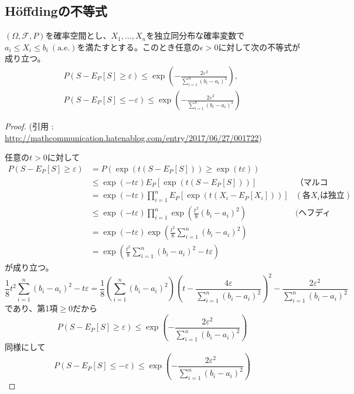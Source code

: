         \subsection{H\"{o}ffdingの不等式}
            \begin{shadebox}
                $(\Omega,\mathcal{F},P)$を確率空間とし、$X_{1},\ldots,X_{n}$を独立同分布な確率変数で$a_{i}\le X_{i} \le b_{i}\ (\mathrm{a.e.})$を満たすとする。このとき任意の$\epsilon>0$に対して次の不等式が成り立つ。
                \begin{gather*}
                    P(S-E_{P}[S]\ge\varepsilon)\le \exp\left(-\frac{2\varepsilon^{2}}{\sum_{i=1}^{n}(b_{i}-a_{i})^{2}}\right),\\
                    P(S-E_{P}[S]\le-\varepsilon)\le\exp\left(-\frac{2\varepsilon^{2}}{\sum_{i=1}^{n}(b_{i}-a_{i})^{2}}\right)
                \end{gather*}
            \end{shadebox}
            \begin{proof}
                \quad\par
                (引用 : \url{http://mathcommunication.hatenablog.com/entry/2017/06/27/001722})
                \par
                任意の$t>0$に対して
                \begin{align*}
                    P(S-E_{P}[S]\ge\varepsilon) &= P(\exp(t(S-E_{P}[S]))\ge\exp(t\varepsilon))\\
                    &\le \exp(-t\varepsilon)E_{P}[\exp(t(S-E_{P}[S]))] & \text{（マルコフの不等式）}\\
                    &= \exp(-t\varepsilon)\prod_{i=1}^{n}E_{P}[\exp(t(X_{i}-E_{P}[X_{i}]))] & (\text{各}X_i\text{は独立})\\
                    &\leq \exp(-t\varepsilon)\prod_{i=1}^{n}\exp\left(\frac{t^2}{8}(b_i-a_i)^2\right) & \text{(ヘフディングの補題)}\\
                    &= \exp(-t\varepsilon)\exp\left(\frac{t^2}{8}\sum_{i=1}^{n}(b_{i}-a_{i})^{2}\right)\\
                    &= \exp\left(\frac{t^2}{8}\sum_{i=1}^{n}(b_{i}-a_{i})^{2} - t\varepsilon\right)
                \end{align*}
                が成り立つ。
                \[\frac{1}{8}t^{2}\sum_{i=1}^{n} (b_{i}-a_{i})^{2}-t\varepsilon = \frac{1}{8}\left(\sum_{i=1}^{n}(b_{i}-a_{i})^{2}\right)\left(t-\frac{4\varepsilon}{\sum_{i=1}^{n}(b_{i}-a_{i})^{2}}\right)^{2}-\frac{2\varepsilon^{2}}{\sum_{i=1}^{n}(b_{i}-a_{i})^{2}}\]
                であり、第1項$\ge0$だから
                \[P(S-E_{P}[S]\ge\varepsilon)\le\exp\left(-\frac{2\varepsilon^{2}}{\sum_{i=1}^{n}(b_{i}-a_{i})^{2}}\right)\]
                同様にして
                \[\displaystyle P(S-E_{P}[S]\le-\varepsilon)\le\exp\left(-\frac{2\varepsilon^{2}}{\sum_{i=1}^{n}(b_{i}-a_{i})^{2}}\right)\]
            \end{proof}
